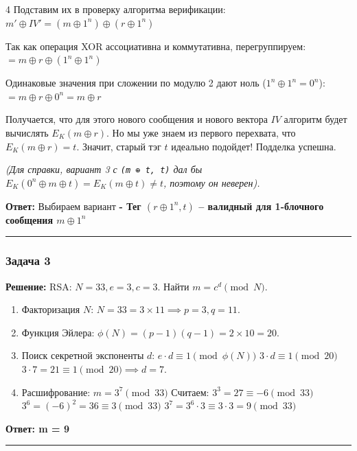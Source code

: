 ﻿\documentclass[8pt,a4paper,landscape]{extarticle}
\newcommand{\tightlist}{}
\begin{document}
\begin{multicols*}{4}
Подставим их в проверку алгоритма верификации: \(m' \oplus IV' = (m \oplus 1^n) \oplus (r \oplus 1^n)\)

Так как операция XOR ассоциативна и коммутативна, перегруппируем: \(= m \oplus r \oplus (1^n \oplus 1^n)\)

Одинаковые значения при сложении по модулю 2 дают ноль (\(1^n \oplus 1^n = 0^n\)): \(= m \oplus r \oplus 0^n = m \oplus r\)

Получается, что для этого нового сообщения и нового вектора \(IV\) алгоритм будет вычислять \(E_K(m \oplus r)\). Но мы уже знаем из первого перехвата, что \(E_K(m \oplus r) = t\). Значит, старый тэг \(t\) идеально подойдет! Подделка успешна.

\emph{(Для справки, вариант 3 с \texttt{(m\ ⊕\ t,\ t)} дал бы \(E_K(0^n \oplus m \oplus t) = E_K(m \oplus t) \neq t\), поэтому он неверен).}

\textbf{Ответ:} Выбираем вариант \textbf{- Тег \((r \oplus 1^n, t)\) -- валидный для 1-блочного сообщения \(m \oplus 1^n\)}

\begin{center}\rule{0.5\linewidth}{0.5pt}\end{center}

\subsubsection{Задача 3}\label{ux437ux430ux434ux430ux447ux430-3}

\textbf{Решение:} RSA: \(N=33, e=3, c=3\). Найти \(m = c^d \pmod N\).

\begin{enumerate}
\def\labelenumi{\arabic{enumi}.}
\tightlist
\item
  Факторизация \(N\): \(N = 33 = 3 \times 11 \implies p=3, q=11\).
\item
  Функция Эйлера: \(\phi(N) = (p-1)(q-1) = 2 \times 10 = 20\).
\item
  Поиск секретной экспоненты \(d\): \(e \cdot d \equiv 1 \pmod{\phi(N)}\) \(3 \cdot d \equiv 1 \pmod{20}\) \(3 \cdot 7 = 21 \equiv 1 \pmod{20} \implies d = 7\).
\item
  Расшифрование: \(m = 3^7 \pmod{33}\) Считаем: \(3^3 = 27 \equiv -6 \pmod{33}\) \(3^6 = (-6)^2 = 36 \equiv 3 \pmod{33}\) \(3^7 = 3^6 \cdot 3 \equiv 3 \cdot 3 = 9 \pmod{33}\)
\end{enumerate}

\textbf{Ответ: m = 9}

\begin{center}\rule{0.5\linewidth}{0.5pt}\end{center}


\end{multicols*}
\end{document}
